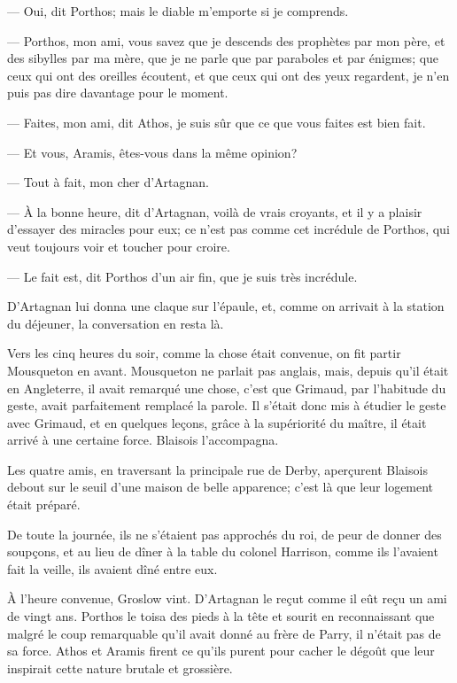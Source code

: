 — Oui, dit Porthos; mais le diable m'emporte si je comprends.

— Porthos, mon ami, vous savez que je descends des prophètes par mon père, et des sibylles par ma mère, que je ne parle que par paraboles et par énigmes; que ceux qui ont des oreilles écoutent, et que ceux qui ont des yeux regardent, je n'en puis pas dire davantage pour le moment.

— Faites, mon ami, dit Athos, je suis sûr que ce que vous faites est bien fait.

— Et vous, Aramis, êtes-vous dans la même opinion?

— Tout à fait, mon cher d'Artagnan.

— À la bonne heure, dit d'Artagnan, voilà de vrais croyants, et il y a plaisir d'essayer des miracles pour eux; ce n'est pas comme cet incrédule de Porthos, qui veut toujours voir et toucher pour croire.

— Le fait est, dit Porthos d'un air fin, que je suis très incrédule.

D'Artagnan lui donna une claque sur l'épaule, et, comme on arrivait à la station du déjeuner, la conversation en resta là.

Vers les cinq heures du soir, comme la chose était convenue, on fit partir Mousqueton en avant. Mousqueton ne parlait pas anglais, mais, depuis qu'il était en Angleterre, il avait remarqué une chose, c'est que Grimaud, par l'habitude du geste, avait parfaitement remplacé la parole. Il s'était donc mis à étudier le geste avec Grimaud, et en quelques leçons, grâce à la supériorité du maître, il était arrivé à une certaine force. Blaisois l'accompagna.

Les quatre amis, en traversant la principale rue de Derby, aperçurent Blaisois debout sur le seuil d'une maison de belle apparence; c'est là que leur logement était préparé.

De toute la journée, ils ne s'étaient pas approchés du roi, de peur de donner des soupçons, et au lieu de dîner à la table du colonel Harrison, comme ils l'avaient fait la veille, ils avaient dîné entre eux.

À l'heure convenue, Groslow vint. D'Artagnan le reçut comme il eût reçu un ami de vingt ans. Porthos le toisa des pieds à la tête et sourit en reconnaissant que malgré le coup remarquable qu'il avait donné au frère de Parry, il n'était pas de sa force. Athos et Aramis firent ce qu'ils purent pour cacher le dégoût que leur inspirait cette nature brutale et grossière.

